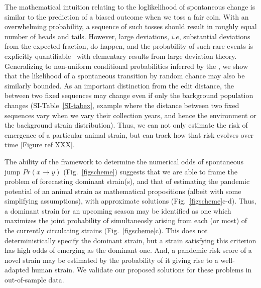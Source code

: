 \documentclass[onecolumn, compsoc,10pt]{IEEEtran}
\begin{document}
The mathematical intuition  relating  \qdist  to the loglikelihood of spontaneous change  is similar to the prediction of  a biased outcome when we  toss a fair coin. With an overwhelming probability, a sequence of such tosses should result in roughly equal number of heads and tails. However, large deviations, $i.e$, substantial deviations from the expected fraction,  do happen, and the probability of such rare events is explicitly quantifiable~\cite{varadhan2010large} with elementary results from large deviation theory. Generalizing to non-uniform conditional probabilities inferred by the \enet, we show  that the likelihood of a spontaneous transition  by random chance may also be similarly bounded. As an important distinction from the edit distance, the \qdist  between two fixed sequences may change even if only the background population changes (SI-Table~\ref{SI-tabex}, example where  the distance between two fixed  sequences vary when we vary their collection years, and hence the environment or the background strain distribution). Thus, we can not only estimate the risk of emergence of a particular animal strain, but can track how that risk evolves over time [Figure ref XXX].




The ability of the \enet framework to determine the numerical odds of spontaneous jump $ Pr(x \rightarrow y)$ (Fig.~\ref{figscheme}) suggests that we are able to frame the problem of forecasting  dominant strain(s), and that of estimating the  pandemic potential of an animal strain as  mathematical propositions (albeit with some simplifying assumptions), with  approximate solutions (Fig.~\ref{figscheme}c-d). Thus,  a dominant strain for an upcoming  season may be identified as one which maximizes the joint probability of simultaneosly arising from each (or most)  of the currently circulating strains (Fig.~\ref{figscheme}c).  This does not deterministically specify the dominant strain, but a strain satisfying this criterion  has  high odds of emerging as the dominant one. And, a pandemic risk score of a novel strain may be estimated by the probability of it giving rise to a well-adapted human strain.  We validate  our proposed solutions for these problems in out-of-sample data.
%
\end{document}
